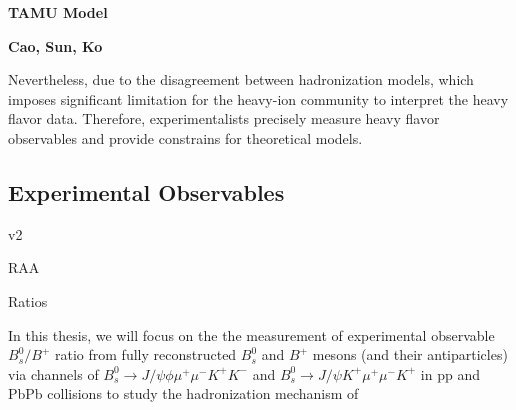 \textbf{TAMU Model}

\textbf{Cao, Sun, Ko}

Nevertheless, due to the disagreement between hadronization models, which imposes significant limitation for the heavy-ion community to interpret the heavy flavor data. Therefore, experimentalists precisely measure heavy flavor observables and provide constrains for theoretical models.

\subsection{Experimental Observables}

v2

RAA

Ratios

In this thesis, we will focus on the the measurement of experimental observable $B^0_s/B^+$ ratio from fully reconstructed $B^0_s$ and $B^+$ mesons (and their antiparticles) via channels of $B^0_s \rightarrow J/\psi \phi \mu^+ \mu^- K^+ K^-$ and $B^0_s \rightarrow J/\psi K^+ \mu^+ \mu^- K^+$ in pp and PbPb collisions to study the hadronization mechanism of 


